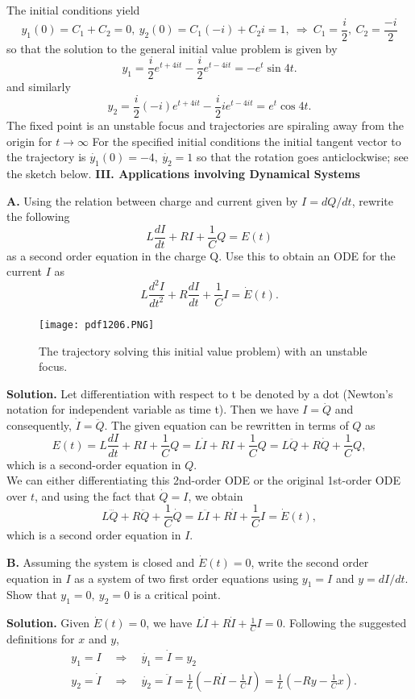 \documentclass[11pt,a4paper]{article}
\begin{document}
	The initial conditions yield
	$$
	y_1(0) = C_1+C_2 = 0,\ y_2(0) = C_1(-i)+C_2i = 1,\ \Rightarrow\ C_1 = \frac{i}{2},\ C_2 = \frac{-i}{2}
	$$
	so that the solution to the general initial value problem is given by
	$$
	y_1 = \frac{i}{2}e^{t+4it} - \frac{i}{2}e^{t-4it} = -e^t\sin 4t.
	$$
	and similarly
	$$
	y_2 = \frac{i}{2}(-i)e^{t+4it} - \frac{i}{2}ie^{t-4it} = e^t\cos 4t.
	$$
	The fixed point is an unstable focus and trajectories are spiraling away from the origin for $t \to \infty$ For the specified initial conditions the initial tangent vector to the trajectory is $\dot{y_1}(0) = -4,\ \dot{y_2} = 1$ so that the rotation goes anticlockwise; see the sketch below.
	\textbf{III. Applications involving Dynamical Systems}\par
	\textbf{A.} Using the relation between charge and current given by $I = dQ/dt$, rewrite the following
	$$
	L\frac{dI}{dt} + RI + \frac{1}{C}Q = E(t)
	$$
	as a second order equation in the charge Q. Use this to obtain an ODE for the current $I$ as
	$$
	L\frac{d^2I}{dt^2} + R\frac{dI}{dt} + \frac{1}{C}I = \dot{E}(t).
	$$
	\begin{figure}[H]
		\centering
			\texttt{[image: pdf1206.PNG]}
			\caption{The trajectory solving this initial value problem) with an unstable focus.}
	\end{figure}
	\textbf{Solution.} Let differentiation with respect to t be denoted by a dot (Newton’s notation for independent variable as time t). Then we have $I = \dot{Q}$ and consequently, $\dot{I} = \ddot{Q}$.  The given equation can be rewritten in terms of $Q$ as
	$$
	E(t) = L\frac{dI}{dt} + RI + \frac{1}{C}Q = L\dot{I} + RI + \frac{1}{C}Q = L\ddot{Q}+R\dot{Q} + \frac{1}{C}Q,
	$$
	which is a second-order equation in $Q.$\\
	We can either differentiating this 2nd-order ODE or the original 1st-order ODE over $t$, and using the fact that $\dot{Q} = I$, we obtain
	$$
	L\dddot{Q}+R\ddot{Q}+\frac{1}{C}\dot{Q} = L\ddot{I} + R\dot{I} + \frac{1}{C}I = \dot{E}(t),
	$$
	which is a second order equation in $I.$\par
	\textbf{B.} Assuming the system is closed and $\dot{E}(t) = 0$, write the second order equation in $I$ as a system of two first order equations using $y_1 = I$ and $y = dI/dt$. Show that $y_1 = 0,\ y_2 = 0$ is a critical point.\par
	\textbf{Solution.} Given $\dot{E}(t) = 0$, we have $L\dot{I}+R\dot{I} + \frac{1}{C}I = 0$. Following the suggested definitions for $x$ and $y$,
	\begin{equation*}
		\begin{aligned}
			&y_1 = I\quad \Rightarrow \quad \dot{y_1} = \dot{I} = y_2\\
			&y_2 = \dot{I} \quad \Rightarrow \quad \dot{y_2} = \ddot{I} = \frac{1}{L}\left(-R\dot{I}-\frac{1}{C}I\right) = \frac{1}{L}\left(-Ry - \frac{1}{C}x\right).
		\end{aligned}
	\end{equation*}
\end{document}
